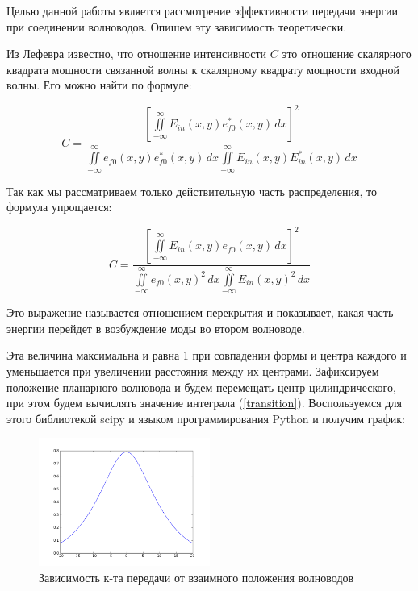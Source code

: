 Целью данной работы является рассмотрение эффективности передачи энергии при соединении волноводов. Опишем эту зависимость теоретически.

Из Лефевра известно, что отношение интенсивности $C$ это отношение скалярного квадрата мощности связанной волны к скалярному квадрату мощности входной волны. Его можно найти по формуле:

\begin{equation}
	\label{coupling_full}
	C = \frac{\left[\iint\limits_{-\infty}^{\infty}E_{in}(x,y)e_{f0}^*(x,y) \,dx\right]^2}
	{\iint\limits_{-\infty}^{\infty}e_{f0}(x,y)e_{f0}^*(x,y) \,dx
	 \iint\limits_{-\infty}^{\infty}E_{in}(x,y)E_{in}^*(x,y) \,dx}
\end{equation}

Так как мы рассматриваем только действительную часть распределения, то формула упрощается:

\begin{equation}
	\label{coupling}
	C = \frac{\left[\iint\limits_{-\infty}^{\infty}E_{in}(x,y)e_{f0}(x,y) \,dx\right]^2}
	{\iint\limits_{-\infty}^{\infty}e_{f0}(x,y)^2 \,dx
	 \iint\limits_{-\infty}^{\infty}E_{in}(x,y)^2 \,dx}
\end{equation}

Это выражение называется отношением перекрытия  и показывает, какая часть энергии перейдет в возбуждение моды во втором волноводе. 

Эта величина максимальна и равна 1 при совпадении формы и центра каждого и уменьшается при увеличении расстояния между их центрами. Зафиксируем положение планарного волновода и будем перемещать центр цилиндрического, при этом будем вычислять значение интеграла (\ref{transition}). Воспользуемся для этого библиотекой scipy и языком программирования Python и получим график:
\begin{figure}[h!]
	\includegraphics[width=0.5\textwidth]{img/transition.png}
	\caption{Зависимость к-та передачи от взаимного положения волноводов}
\end{figure}

